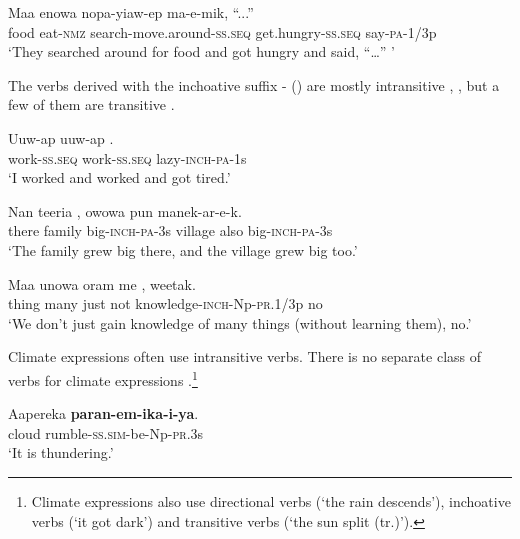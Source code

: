 \ea%
\label{ex:3:x1485}
\gll Maa enowa nopa-yiaw-ep  ma-e-mik, ``...''\\
food eat-\textsc{nmz} search-move.around-\textsc{ss}.\textsc{seq} get.hungry-\textsc{ss}.\textsc{seq} say-\textsc{pa}-1/3p\\
\glt`They searched around for food and got hungry and said, ``{\dots}'' '
\z

The verbs derived with the inchoative suffix \nobreakdash- () are mostly intransitive , , but a few of them are transitive . 

\ea%
\label{ex:3:x271}
\gll Uuw-ap uuw-ap . \\
work-\textsc{ss}.\textsc{seq} work-\textsc{ss}.\textsc{seq} lazy-\textsc{inch}-\textsc{pa}-1s \\
\glt`I worked and worked and got tired.'
\z

\ea%
\label{ex:3:x1486}
\gll Nan teeria , owowa pun manek-ar-e-k. \\
there family big-\textsc{inch}-\textsc{pa}-3s village also big-\textsc{inch}-\textsc{pa}-3s\\
\glt`The family grew big there, and the village grew big too.'
\z

\ea%
\label{ex:3:x1836}
\gll Maa unowa oram me \textstyleEmphasizedVernacularWords{-}\textstyleEmphasizedVernacularWords{-}\textstyleEmphasizedVernacularWords{-}, weetak. \\
thing many just not knowledge-\textsc{inch}-Np-\textsc{pr}.1/3p no\\
\glt`We don't just gain knowledge of many things (without learning them), no.'
\z

Climate expressions often use intransitive verbs. There is no separate class of verbs for climate expressions .\footnote{Climate expressions also use directional verbs (`the rain descends'), inchoative verbs (`it got dark') and transitive verbs (`the sun split (tr.)').}

\ea%
\label{ex:3:x270}
\gll Aapereka \textbf{paran-em-ika-i-ya}. \\
cloud rumble-\textsc{ss}.\textsc{sim}-be-Np-\textsc{pr}.3s\\
\glt`It is thundering.'
\z

